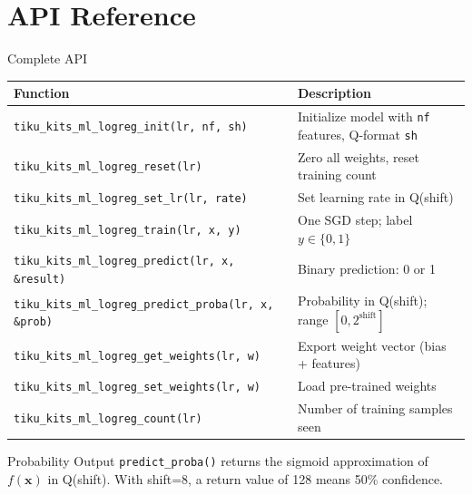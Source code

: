 \documentclass[aspectratio=169, 10pt]{beamer}
\begin{document}
\section{API Reference}

\begin{frame}[fragile]{Complete API}
\begin{table}
\centering
\small
\begin{tabular}{@{}lp{8cm}@{}}
\toprule
\textbf{Function} & \textbf{Description} \\
\midrule
\texttt{tiku\_kits\_ml\_logreg\_init(lr, nf, sh)}
  & Initialize model with \texttt{nf} features, Q-format \texttt{sh} \\
\texttt{tiku\_kits\_ml\_logreg\_reset(lr)}
  & Zero all weights, reset training count \\
\texttt{tiku\_kits\_ml\_logreg\_set\_lr(lr, rate)}
  & Set learning rate in Q(shift) \\
\midrule
\texttt{tiku\_kits\_ml\_logreg\_train(lr, x, y)}
  & One SGD step; label $y \in \{0,1\}$ \\
\texttt{tiku\_kits\_ml\_logreg\_predict(lr, x, \&result)}
  & Binary prediction: 0 or 1 \\
\texttt{tiku\_kits\_ml\_logreg\_predict\_proba(lr, x, \&prob)}
  & Probability in Q(shift); range $[0, 2^{\text{shift}}]$ \\
\midrule
\texttt{tiku\_kits\_ml\_logreg\_get\_weights(lr, w)}
  & Export weight vector (bias + features) \\
\texttt{tiku\_kits\_ml\_logreg\_set\_weights(lr, w)}
  & Load pre-trained weights \\
\texttt{tiku\_kits\_ml\_logreg\_count(lr)}
  & Number of training samples seen \\
\bottomrule
\end{tabular}
\end{table}

\vspace{0.3em}
\begin{alertblock}{Probability Output}
\texttt{predict\_proba()} returns the sigmoid approximation of $f(\mathbf{x})$
in Q(shift). With shift=8, a return value of 128 means 50\% confidence.
\end{alertblock}
\end{frame}

\end{document}
